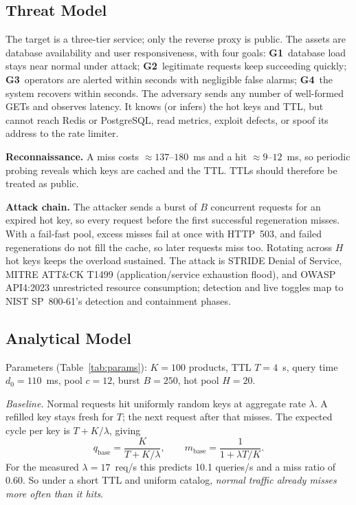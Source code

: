 \documentclass[journal]{IEEEtran}
\begin{document}
\subsection{Threat Model}
The target is a three-tier service; only the reverse proxy is public. The assets are
database availability and user responsiveness, with four goals: \textbf{G1}~database
load stays near normal under attack; \textbf{G2}~legitimate requests keep succeeding
quickly; \textbf{G3}~operators are alerted within seconds with negligible false
alarms; \textbf{G4}~the system recovers within seconds. The adversary sends any
number of well-formed GETs and observes latency. It knows (or infers) the hot keys and
TTL, but cannot reach Redis or PostgreSQL, read metrics, exploit defects, or spoof its
address to the rate limiter.

\textbf{Reconnaissance.} A miss costs ${\approx}137$--$180$~ms and a hit
${\approx}9$--$12$~ms, so periodic probing reveals which keys are cached and the TTL.
TTLs should therefore be treated as public.

\textbf{Attack chain.} The attacker sends a burst of $B$ concurrent requests for an
expired hot key, so every request before the first successful regeneration misses.
With a fail-fast pool, excess misses fail at once with HTTP~503, and failed
regenerations do not fill the cache, so later requests miss too. Rotating across $H$
hot keys keeps the overload sustained. The attack is STRIDE Denial of Service, MITRE ATT\&CK T1499 (application/service exhaustion flood), and OWASP API4:2023 unrestricted resource consumption; detection and live toggles map to NIST SP~800-61's
detection and containment phases.

\subsection{Analytical Model}
\label{sec:model}
Parameters (Table~\ref{tab:params}): $K=100$ products, TTL $T=4$~s, query time
$d_0=110$~ms, pool $c=12$, burst $B=250$, hot pool $H=20$.

\emph{Baseline.} Normal requests hit uniformly random keys at aggregate rate
$\lambda$. A refilled key stays fresh for $T$; the next request after that misses. The
expected cycle per key is $T+K/\lambda$, giving
\begin{equation}
q_{\mathrm{base}} = \frac{K}{T + K/\lambda}, \qquad
m_{\mathrm{base}} = \frac{1}{1+\lambda T/K}.
\label{eq:baseline}
\end{equation}
For the measured $\lambda=17$~req/s this predicts 10.1 queries/s and a miss ratio of
0.60. So under a short TTL and uniform catalog, \emph{normal traffic already misses
more often than it hits}.
\end{document}
